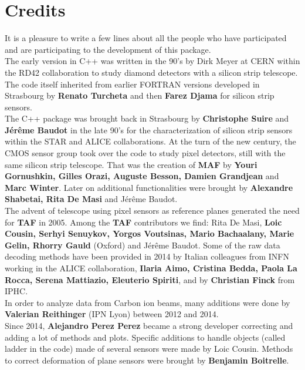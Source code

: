 \documentclass[a4paper, 12pt, twoside]{article}
\newcommand{\TAF}{{\bf TAF }}
\newcommand{\MAF}{{\bf MAF }}
\begin{document}
\newpage

\section{Credits}
\label{secCredits}

It is a pleasure to write a few lines about all the people who have participated and are participating to the development of this package.\\
The early version in C++ was written in the 90's by Dirk Meyer at CERN within the RD42 collaboration to study diamond detectors with a silicon strip telescope. The code itself inherited from earlier FORTRAN versions developed in Strasbourg by {\bf Renato Turcheta} and then {\bf Farez Djama} for silicon strip sensors.\\

The C++ package was brought back in Strasbourg by {\bf Christophe Suire} and {\bf J\'er\^eme Baudot} in the late 90's for the characterization of silicon strip sensors within the STAR and ALICE collaborations. At the turn of the new century, the CMOS sensor group took over the code to study pixel detectors, still with the same silicon strip telescope. That was the creation of \MAF  by {\bf Youri Gornushkin, Gilles Orazi, Auguste Besson, Damien Grandjean} and {\bf Marc Winter}. Later on additional functionalities were brought by {\bf Alexandre Shabetai, Rita De Masi} and J\'er\^eme Baudot.\\

The advent of telescope using pixel sensors as reference planes generated the need for \TAF  in 2005. Among the \TAF  contributors we find: Rita De Masi, {\bf Loic Cousin, Serhyi Senuykov, Yorgos Voutsinas, Mario Bachaalany, Marie Gelin, Rhorry Gauld} (Oxford) and J\'er\^eme Baudot. Some of the raw data decoding methods have been provided in 2014 by Italian colleagues from INFN working in the ALICE collaboration, {\bf Ilaria Aimo, Cristina Bedda, Paola La Rocca, Serena Mattiazio, Eleuterio Spiriti},  and by {\bf Christian Finck} from IPHC.\\
In order to analyze data from Carbon ion beams, many additions were done by {\bf Valerian Reithinger} (IPN Lyon) between 2012 and 2014.\\
Since 2014, {\bf Alejandro Perez Perez} became a strong developer correcting and adding a lot of methods and plots. Specific additions to handle objects (called ladder in the code) made of several sensors were made by Loic Cousin. Methods to correct deformation of plane sensors were brought by {\bf Benjamin Boitrelle}.\\
\end{document}
